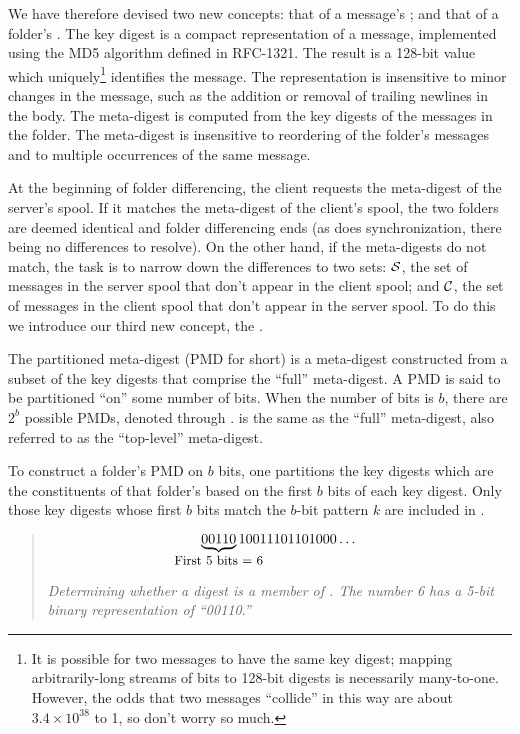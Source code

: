We have therefore devised two new concepts: that of a message's
; and that of a folder's .  The key
digest is a compact representation of a message, implemented using the
MD5 algorithm defined in RFC-1321.  The result is a 128-bit value
which uniquely\footnote{It is possible for two messages to have the
same key digest; mapping arbitrarily-long streams of bits to 128-bit
digests is necessarily many-to-one.  However, the odds that two
messages ``collide'' in this way are about $3.4\times{10^{38}}$ to 1, so
don't worry so much.} identifies the message.  The representation is
insensitive to minor changes in the message, such as the addition or
removal of trailing newlines in the body.  The meta-digest is computed
from the key digests of the messages in the folder.  The meta-digest
is insensitive to reordering of the folder's messages and to multiple
occurrences of the same message.

At the beginning of folder differencing, the client requests the
meta-digest of the server's spool.  If it matches the meta-digest of
the client's spool, the two folders are deemed identical and folder
differencing ends (as does synchronization, there being no differences
to resolve).  On the other hand, if the meta-digests do not match, the
task is to narrow down the differences to two sets: ${\cal S}$, the
set of messages in the server spool that don't appear in the client
spool; and ${\cal C}$, the set of messages in the client spool that
don't appear in the server spool.  To do this we introduce our third
new concept, the .

The partitioned meta-digest (PMD for short) is a meta-digest
constructed from a subset of the key digests that comprise the
``full'' meta-digest.  A PMD is said to be partitioned ``on'' some
number of bits.  When the number of bits is $b$, there are $2^b$
possible PMDs, denoted  through .
 is the same as the ``full'' meta-digest, also referred to
as the ``top-level'' meta-digest.

To construct a folder's PMD on $b$ bits, one partitions the key
digests which are the constituents of that folder's  based on
the first $b$ bits of each key digest.  Only those key digests whose
first $b$ bits match the $b$-bit pattern $k$ are included in
.

\begin{quotation}
\begin{displaymath}
\underbrace{00110}_{\makebox[0pt]{\small First 5 bits = 6}}10011101101000\ldots{}
\end{displaymath}

\noindent
{\it Determining whether a digest is a member of .  The
number 6 has a 5-bit binary representation of ``00110.''}
\end{quotation}

